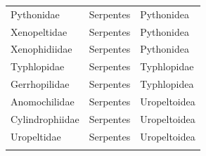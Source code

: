 \documentclass[a4paper, 12pt]{article}
\begin{document}
\begin{longtable}{lll}
Pythonidae & Serpentes & Pythonidea \\
Xenopeltidae & Serpentes & Pythonidea \\
Xenophidiidae & Serpentes & Pythonidea \\
Typhlopidae & Serpentes & Typhlopidae \\
Gerrhopilidae & Serpentes & Typhlopidea \\
Anomochilidae & Serpentes & Uropeltoidea \\
Cylindrophiidae & Serpentes & Uropeltoidea \\
Uropeltidae & Serpentes & Uropeltoidea \\
\hline

\label{table_higher-definitions}
\end{longtable}


\newpage






\newpage





\end{document}
